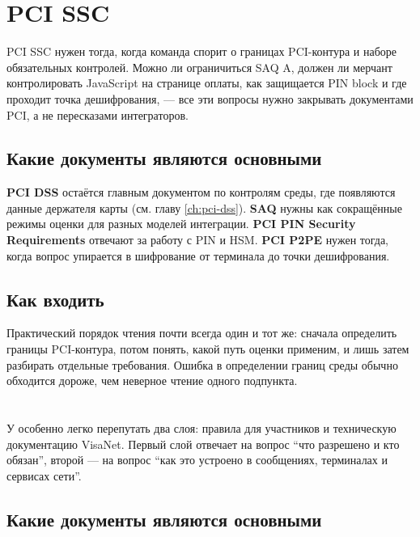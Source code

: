 \section{PCI SSC}
\label{sec:ps-pci}

PCI SSC нужен тогда, когда команда спорит о границах PCI-контура
и наборе обязательных контролей. Можно ли ограничиться SAQ A, должен ли
мерчант контролировать JavaScript на странице оплаты, как защищается
PIN block и где проходит точка дешифрования, --- все эти вопросы
нужно закрывать документами PCI, а не пересказами интеграторов.

\subsection*{Какие документы являются основными}

\textbf{PCI DSS} остаётся главным документом по контролям среды,
где появляются данные держателя карты
(см. главу \ref{ch:pci-dss}). \textbf{SAQ} нужны как сокращённые
режимы оценки для разных моделей интеграции.
\textbf{PCI PIN Security Requirements} отвечают за работу
с PIN и HSM. \textbf{PCI P2PE} нужен тогда, когда вопрос
упирается в шифрование от терминала до точки дешифрования.

\subsection*{Как входить}

Практический порядок чтения почти всегда один и тот же: сначала
определить границы PCI-контура, потом понять, какой путь оценки
применим, и лишь затем разбирать отдельные требования. Ошибка
в определении границ среды обычно обходится дороже, чем неверное
чтение одного подпункта.

\section{}
\label{sec:ps-visa}

У  особенно легко перепутать два слоя: правила
для участников и техническую документацию VisaNet. Первый слой
отвечает на вопрос \enquote{что разрешено и кто обязан}, второй ---
на вопрос \enquote{как это устроено в сообщениях, терминалах
и сервисах сети}.

\subsection*{Какие документы являются основными}

